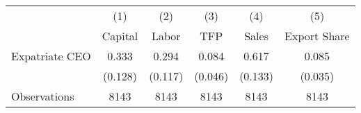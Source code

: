 \begin{tabular}{l*{5}{c}}
\hline\hline
                    &\multicolumn{1}{c}{(1)}&\multicolumn{1}{c}{(2)}&\multicolumn{1}{c}{(3)}&\multicolumn{1}{c}{(4)}&\multicolumn{1}{c}{(5)}\\
                    &\multicolumn{1}{c}{Capital}&\multicolumn{1}{c}{Labor}&\multicolumn{1}{c}{TFP}&\multicolumn{1}{c}{Sales}&\multicolumn{1}{c}{Export Share}\\
\hline
Expatriate CEO      &       0.333&       0.294&       0.084&       0.617&       0.085\\
                    &     (0.128)&     (0.117)&     (0.046)&     (0.133)&     (0.035)\\
\hline
Observations        &        8143&        8143&        8143&        8143&        8143\\
\hline\hline
\end{tabular}
